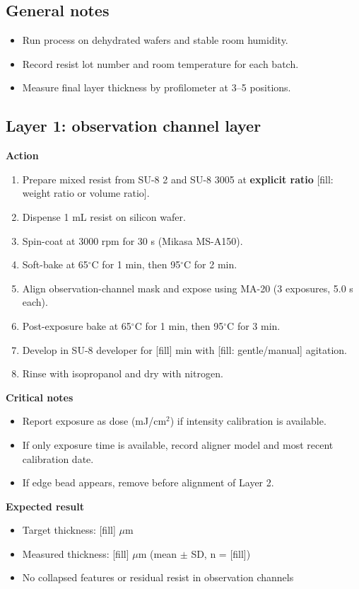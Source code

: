 \subsection{General notes}
\begin{itemize}
  \item Run process on dehydrated wafers and stable room humidity.
  \item Record resist lot number and room temperature for each batch.
  \item Measure final layer thickness by profilometer at 3--5 positions.
\end{itemize}

\subsection{Layer 1: observation channel layer}
\textbf{Action}
\begin{enumerate}
  \item Prepare mixed resist from SU-8 2 and SU-8 3005 at \textbf{explicit ratio} [fill: weight ratio or volume ratio].
  \item Dispense 1 mL resist on silicon wafer.
  \item Spin-coat at 3000 rpm for 30 s (Mikasa MS-A150).
  \item Soft-bake at 65$^{\circ}$C for 1 min, then 95$^{\circ}$C for 2 min.
  \item Align observation-channel mask and expose using MA-20 (3 exposures, 5.0 s each).
  \item Post-exposure bake at 65$^{\circ}$C for 1 min, then 95$^{\circ}$C for 3 min.
  \item Develop in SU-8 developer for [fill] min with [fill: gentle/manual] agitation.
  \item Rinse with isopropanol and dry with nitrogen.
\end{enumerate}

\textbf{Critical notes}
\begin{itemize}
  \item Report exposure as dose (mJ/cm$^2$) if intensity calibration is available.
  \item If only exposure time is available, record aligner model and most recent calibration date.
  \item If edge bead appears, remove before alignment of Layer 2.
\end{itemize}

\textbf{Expected result}
\begin{itemize}
  \item Target thickness: [fill] $\mu$m
  \item Measured thickness: [fill] $\mu$m (mean $\pm$ SD, n = [fill])
  \item No collapsed features or residual resist in observation channels
\end{itemize}

